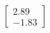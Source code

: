 \documentclass[preview]{standalone}
\begin{document}
\begin{align*}
\begin{bmatrix} 2.89 \\ -1.83 \end{bmatrix}
\end{align*}
\end{document}
